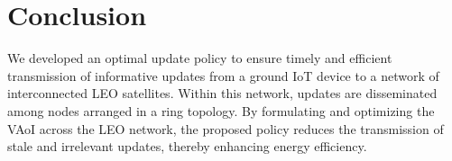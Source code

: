 \documentclass[lettersize,journal]{IEEEtran}
\begin{document}
    \section{Conclusion}
    We developed an optimal update policy to ensure timely and efficient transmission of informative updates from a ground IoT device to a network of interconnected LEO satellites. Within this network, updates are disseminated among nodes arranged in a ring topology. By formulating and optimizing the VAoI across the LEO network, the proposed policy reduces the transmission of stale and irrelevant updates, thereby enhancing energy efficiency.

    
    
    
\end{document}
